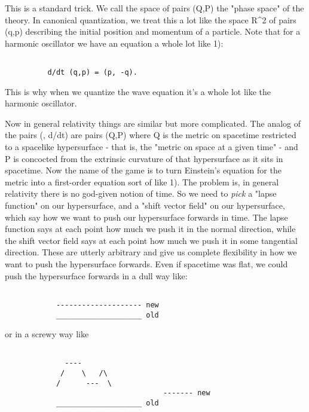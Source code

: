 This is a standard trick.  We call the space of pairs (Q,P) the "phase
space" of the theory.  In canonical quantization, we treat this a lot
like the space R^2 of pairs (q,p) describing the initial position and
momentum of a particle.  Note that for a harmonic oscillator we have an
equation a whole lot like 1):


\begin{verbatim}

		  d/dt (q,p) = (p, -q).  
\end{verbatim}
    
This is why when we quantize the wave equation it's a whole lot like the
harmonic oscillator.

Now in general relativity things are similar but more complicated.  
The analog of the pairs (\phi , d\phi /dt) are pairs (Q,P) where Q is the
metric on spacetime restricted to a spacelike hypersurface - that is,
the "metric on space at a given time" - and P is concocted from the
extrinsic curvature of that hypersurface as it sits in spacetime.   
Now the name of the game is to turn Einstein's equation for the metric
into a first-order equation sort of like 1).  The problem is, in general
relativity there is no god-given notion of time.  So we need to \emph{pick} a
"lapse function" on our hypersurface, and a "shift vector field" on our
hypersurface, which say how we want to push our hypersurface forwards in
time.  The lapse function says at each point how much we push it in the
normal direction, while the shift vector field says at each point how
much we push it in some tangential direction.  These are utterly
arbitrary and give us complete flexibility in how we want to push the
hypersurface forwards.  Even if spacetime was flat, we could push the
hypersurface forwards in a dull way like:





\begin{verbatim}

			-------------------- new
			____________________ old

\end{verbatim}
    
or in a screwy way like


\begin{verbatim}

			  ----
 			 /    \   /\
			/      ---  \
                                     ------- new
			____________________ old

\end{verbatim}
    
